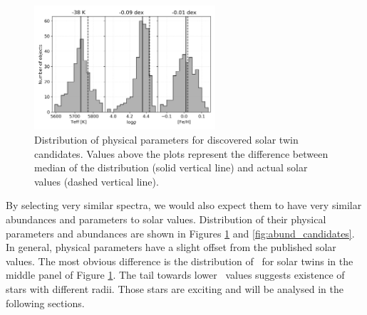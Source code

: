 \begin{figure}
	\centering
	\includegraphics[width=0.6\textwidth]{solar_twins_like_07_ebv_c3.png}
	\caption{Distribution of physical parameters \protect\cite{buder2020} for discovered solar twin candidates. Values above the plots represent the difference between median of the distribution (solid vertical line) and actual solar values (dashed vertical line).}
	\label{fig:twins_stats}
\end{figure}

By selecting very similar spectra, we would also expect them to have very similar abundances and parameters to solar values. Distribution of their physical parameters and abundances are shown in Figures \ref{fig:twins_stats} and \ref{fig:abund_candidates}. In general, physical parameters have a slight offset from the published solar values. The most obvious difference is the distribution of \Logg\ for solar twins in the middle panel of Figure \ref{fig:twins_stats}. The tail towards lower \Logg\ values suggests existence of stars with different radii. Those stars are exciting and will be analysed in the following sections.

